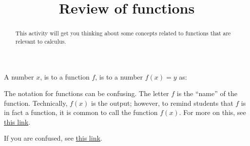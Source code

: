 \documentclass{ximera}
\title{Review of functions}
\begin{document}
\begin{abstract}
  This activity will get you thinking about some concepts related to
  functions that are relevant to calculus.
\end{abstract}
\maketitle


\begin{question}
  A number $x$, is to a function $f$, is to a number $f(x)=y$ as:
  \begin{hint}
      The notation for functions can be confusing. The letter $f$ is
      the ``name'' of the function. Technically, $f(x)$ is the output;
      however, to remind students that $f$ is in fact a function, it
      is common to call the function $f(x)$. For more on this,
      see \href{http://www.purplemath.com/modules/fcnnot.htm}{this link}.
  \end{hint}
  \begin{hint}
    If you are confused, see \href{http://en.wikipedia.org/wiki/Function_(mathematics)}{this link}.
  \end{hint}
  \begin{multipleChoice}
  \end{multipleChoice}
\end{question}
\end{document}
